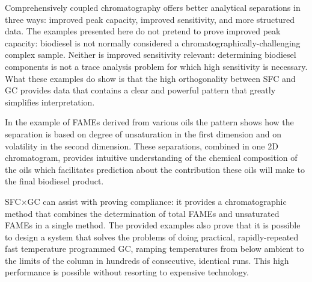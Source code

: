 Comprehensively coupled chromatography offers better analytical separations in
three ways: improved peak capacity, improved sensitivity, and more structured
data. The examples presented here do not pretend to prove improved peak
capacity: biodiesel is not normally considered a chromatographically-challenging
complex sample. Neither is improved sensitivity relevant: determining biodiesel
components is not a trace analysis problem for which high sensitivity is
necessary. What these examples do show is that the high orthogonality between
SFC and GC provides data that contains a clear and powerful pattern that greatly
simplifies interpretation.

In the example of FAMEs derived from various oils the pattern shows how the
separation is based on degree of unsaturation in the first dimension and on
volatility in the second dimension. These separations, combined in one 2D
chromatogram, provides intuitive understanding of the chemical composition of
the oils which facilitates prediction about the contribution these oils will
make to the final biodiesel product.

SFC×GC can assist with proving compliance: it provides a chromatographic method
that combines the determination of total FAMEs and unsaturated FAMEs in a single
method. The provided examples also prove that it is possible to design a system
that solves the problems of doing practical, rapidly-repeated fast temperature
programmed GC, ramping temperatures from below ambient to the limits of the
column in hundreds of consecutive, identical runs. This high performance is
possible without resorting to expensive technology.
